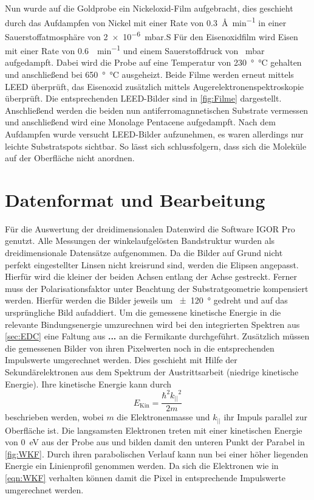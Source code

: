         Nun wurde auf die Goldprobe ein Nickeloxid-Film aufgebracht, dies geschieht durch das Aufdampfen von Nickel mit einer Rate von \SI{0.3}{\angstrom\per\minute} in einer Sauerstoffatmosphäre von \SI{2e-6}{\milli\bar}.S
        Für den Eisenoxidfilm wird Eisen mit einer Rate von \SI{0.6}{\ML\per\minute} und einem Sauerstoffdruck von \SI{}{\milli\bar} aufgedampft.
        Dabei wird die Probe auf eine Temperatur von \SI{230}{\degree\celsius} gehalten und anschließend bei \SI{650}{\degree\celsius} ausgeheizt.
        Beide Filme werden erneut mittels LEED überprüft, das Eisenoxid zusätzlich mittels Augerelektronenspektroskopie überprüft.
        Die entsprechenden LEED-Bilder sind in \autoref{fig:Filme} dargestellt.
        Anschließend werden die beiden nun antiferromagnnetischen Substrate vermessen und anschließend wird eine Monolage Pentacene aufgedampft.
        Nach dem Aufdampfen wurde versucht LEED-Bilder aufzunehmen, es waren allerdings nur leichte Substratspots sichtbar.
        So lässt sich schlussfolgern, dass sich die Moleküle auf der Oberfläche nicht anordnen.

        

    \section{Datenformat und Bearbeitung}
        Für die Auswertung der dreidimensionalen Datenwird die Software IGOR Pro \cite{IGOR} genutzt.
        Alle Messungen der winkelaufgelösten Bandstruktur wurden als dreidimensionale Datensätze aufgenommen.
        Da die Bilder auf Grund nicht perfekt eingestellter Linsen nicht kreisrund sind, werden die Elipsen angepasst.
        Hierfür wird die kleiner der beiden Achsen entlang der Achse gestreckt.
        Ferner muss der Polarisationsfaktor unter Beachtung der Substratgeometrie kompensiert werden.
        Hierfür werden die Bilder jeweils um \SI{\pm120}{\degree} gedreht und auf das ursprüngliche Bild aufaddiert.
        Um die gemessene kinetische Energie in die relevante Bindungsenergie umzurechnen wird bei den integrierten Spektren aus \autoref{sec:EDC} eine Faltung aus \textbf{...} an die Fermikante durchgeführt.
        Zusätzlich müssen die gemessenen Bilder von ihren Pixelwerten noch in die entsprechenden Impulswerte umgerechnet werden.
        Dies geschieht mit Hilfe der Sekundärelektronen aus dem Spektrum der Austrittsarbeit (niedrige kinetische Energie).
        Ihre kinetische Energie kann durch 
        \begin{equation}
            E_\text{Kin} = \frac{\hbar^2 {k_{||}}^2}{2 m}
            \label{eqn:WKF}
        \end{equation}
        beschrieben werden, wobei $m$ die Elektronenmasse und $k_{||}$ ihr Impuls parallel zur Oberfläche ist.
        Die langsamsten Elektronen treten mit einer kinetischen Energie von \SI{0}{\electronvolt} aus der Probe aus und bilden damit den unteren Punkt der Parabel in \autoref{fig:WKF}.
        Durch ihren parabolischen Verlauf kann nun bei einer höher liegenden Energie ein Linienprofil genommen werden.
        Da sich die Elektronen wie in \autoref{eqn:WKF} verhalten können damit die Pixel in entsprechende Impulswerte umgerechnet werden.


